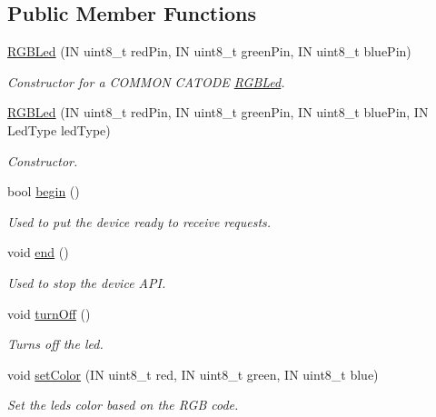 \subsection*{Public Member Functions}
\begin{DoxyCompactItemize}
\item 
\hyperlink{class_easyuino_1_1_r_g_b_led_a3580be3110cebddcd06917994ebdb8ad}{R\+G\+B\+Led} (IN uint8\+\_\+t red\+Pin, IN uint8\+\_\+t green\+Pin, IN uint8\+\_\+t blue\+Pin)
\begin{DoxyCompactList}\small\item\em Constructor for a C\+O\+M\+M\+ON C\+A\+T\+O\+DE \hyperlink{class_easyuino_1_1_r_g_b_led}{R\+G\+B\+Led}. \end{DoxyCompactList}\item 
\hyperlink{class_easyuino_1_1_r_g_b_led_a85c5af3b8b5288d7b45eabcf4fc71aba}{R\+G\+B\+Led} (IN uint8\+\_\+t red\+Pin, IN uint8\+\_\+t green\+Pin, IN uint8\+\_\+t blue\+Pin, IN Led\+Type led\+Type)
\begin{DoxyCompactList}\small\item\em Constructor. \end{DoxyCompactList}\item 
bool \hyperlink{class_easyuino_1_1_r_g_b_led_abdc3512266c7f584609147fccc1ec816}{begin} ()
\begin{DoxyCompactList}\small\item\em Used to put the device ready to receive requests. \end{DoxyCompactList}\item 
void \hyperlink{class_easyuino_1_1_r_g_b_led_ad0e9fb0da405c537e876c8a2dc22246e}{end} ()
\begin{DoxyCompactList}\small\item\em Used to stop the device A\+PI. \end{DoxyCompactList}\item 
void \hyperlink{class_easyuino_1_1_r_g_b_led_a100140fa6d32e190f68cdc1e24c3aba0}{turn\+Off} ()
\begin{DoxyCompactList}\small\item\em Turns off the led. \end{DoxyCompactList}\item 
void \hyperlink{class_easyuino_1_1_r_g_b_led_a4c113ab3fbbd2a75f020a902355faa3e}{set\+Color} (IN uint8\+\_\+t red, IN uint8\+\_\+t green, IN uint8\+\_\+t blue)
\begin{DoxyCompactList}\small\item\em Set the led\textquotesingle{}s color based on the R\+GB code. \end{DoxyCompactList}\item 

\end{DoxyCompactItemize}
